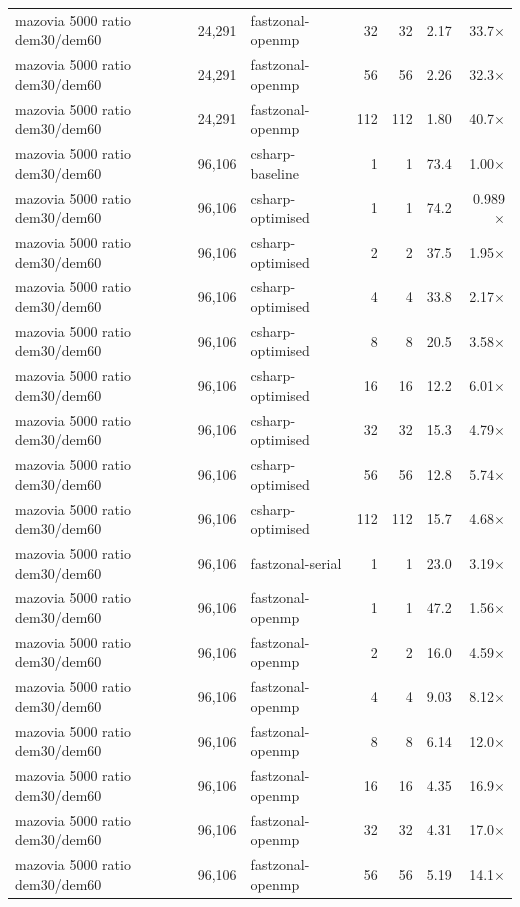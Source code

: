 \begin{tabular}{lrlrrrr}
mazovia 5000 ratio dem30/dem60 & 24,291 & fastzonal-openmp & 32 & 32 & 2.17 & 33.7$\times$ \\
mazovia 5000 ratio dem30/dem60 & 24,291 & fastzonal-openmp & 56 & 56 & 2.26 & 32.3$\times$ \\
mazovia 5000 ratio dem30/dem60 & 24,291 & fastzonal-openmp & 112 & 112 & 1.80 & 40.7$\times$ \\
mazovia 5000 ratio dem30/dem60 & 96,106 & csharp-baseline & 1 & 1 & 73.4 & 1.00$\times$ \\
mazovia 5000 ratio dem30/dem60 & 96,106 & csharp-optimised & 1 & 1 & 74.2 & 0.989$\times$ \\
mazovia 5000 ratio dem30/dem60 & 96,106 & csharp-optimised & 2 & 2 & 37.5 & 1.95$\times$ \\
mazovia 5000 ratio dem30/dem60 & 96,106 & csharp-optimised & 4 & 4 & 33.8 & 2.17$\times$ \\
mazovia 5000 ratio dem30/dem60 & 96,106 & csharp-optimised & 8 & 8 & 20.5 & 3.58$\times$ \\
mazovia 5000 ratio dem30/dem60 & 96,106 & csharp-optimised & 16 & 16 & 12.2 & 6.01$\times$ \\
mazovia 5000 ratio dem30/dem60 & 96,106 & csharp-optimised & 32 & 32 & 15.3 & 4.79$\times$ \\
mazovia 5000 ratio dem30/dem60 & 96,106 & csharp-optimised & 56 & 56 & 12.8 & 5.74$\times$ \\
mazovia 5000 ratio dem30/dem60 & 96,106 & csharp-optimised & 112 & 112 & 15.7 & 4.68$\times$ \\
mazovia 5000 ratio dem30/dem60 & 96,106 & fastzonal-serial & 1 & 1 & 23.0 & 3.19$\times$ \\
mazovia 5000 ratio dem30/dem60 & 96,106 & fastzonal-openmp & 1 & 1 & 47.2 & 1.56$\times$ \\
mazovia 5000 ratio dem30/dem60 & 96,106 & fastzonal-openmp & 2 & 2 & 16.0 & 4.59$\times$ \\
mazovia 5000 ratio dem30/dem60 & 96,106 & fastzonal-openmp & 4 & 4 & 9.03 & 8.12$\times$ \\
mazovia 5000 ratio dem30/dem60 & 96,106 & fastzonal-openmp & 8 & 8 & 6.14 & 12.0$\times$ \\
mazovia 5000 ratio dem30/dem60 & 96,106 & fastzonal-openmp & 16 & 16 & 4.35 & 16.9$\times$ \\
mazovia 5000 ratio dem30/dem60 & 96,106 & fastzonal-openmp & 32 & 32 & 4.31 & 17.0$\times$ \\
mazovia 5000 ratio dem30/dem60 & 96,106 & fastzonal-openmp & 56 & 56 & 5.19 & 14.1$\times$ \\

\end{tabular}
